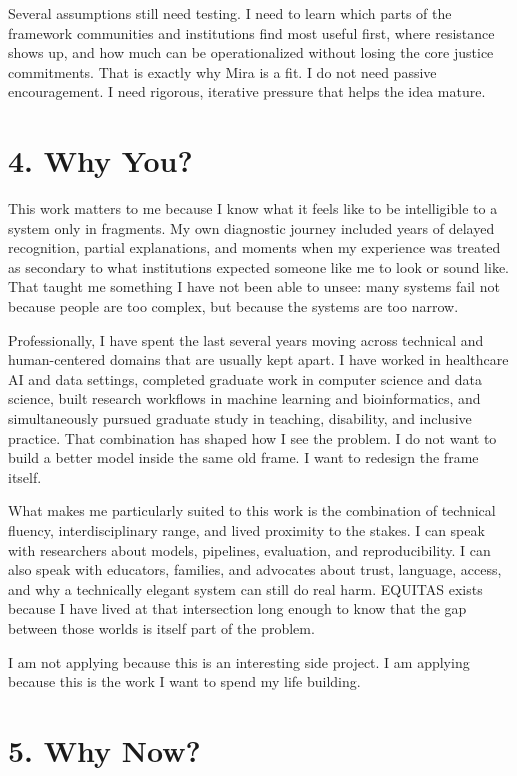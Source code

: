 \documentclass[11pt]{article}
\begin{document}
Several assumptions still need testing. I need to learn which parts of the framework communities and institutions find most useful first, where resistance shows up, and how much can be operationalized without losing the core justice commitments. That is exactly why Mira is a fit. I do not need passive encouragement. I need rigorous, iterative pressure that helps the idea mature.

\section*{4. Why You?}

This work matters to me because I know what it feels like to be intelligible to a system only in fragments. My own diagnostic journey included years of delayed recognition, partial explanations, and moments when my experience was treated as secondary to what institutions expected someone like me to look or sound like. That taught me something I have not been able to unsee: many systems fail not because people are too complex, but because the systems are too narrow.

Professionally, I have spent the last several years moving across technical and human-centered domains that are usually kept apart. I have worked in healthcare AI and data settings, completed graduate work in computer science and data science, built research workflows in machine learning and bioinformatics, and simultaneously pursued graduate study in teaching, disability, and inclusive practice. That combination has shaped how I see the problem. I do not want to build a better model inside the same old frame. I want to redesign the frame itself.

What makes me particularly suited to this work is the combination of technical fluency, interdisciplinary range, and lived proximity to the stakes. I can speak with researchers about models, pipelines, evaluation, and reproducibility. I can also speak with educators, families, and advocates about trust, language, access, and why a technically elegant system can still do real harm. EQUITAS exists because I have lived at that intersection long enough to know that the gap between those worlds is itself part of the problem.

I am not applying because this is an interesting side project. I am applying because this is the work I want to spend my life building.

\section*{5. Why Now?}
\end{document}
